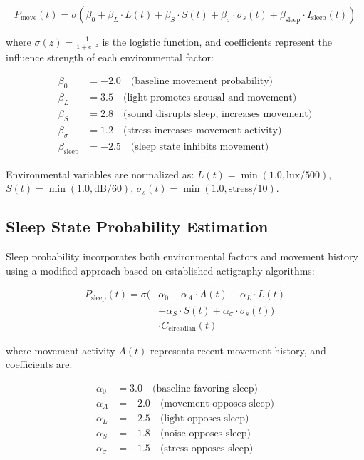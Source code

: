 \documentclass[conference]{IEEEtran}
\begin{document}
\begin{equation}
	P_{\text{move}}(t) = \sigma\left(\beta_0 + \beta_L \cdot L(t) + \beta_S \cdot S(t) + \beta_{\sigma} \cdot \sigma_s(t) + \beta_{\text{sleep}} \cdot I_{\text{sleep}}(t)\right)
\end{equation}

where $\sigma(z) = \frac{1}{1+e^{-z}}$ is the logistic function, and coefficients represent the influence strength of each environmental factor:

\begin{align}
	\beta_0               & = -2.0 \quad \text{(baseline movement probability)}                      \\
	\beta_L    & = 3.5 \quad \text{(light promotes arousal and movement)}          \\
	\beta_S     & = 2.8 \quad \text{(sound disrupts sleep, increases movement)}          \\
	\beta_{\sigma} & = 1.2 \quad \text{(stress increases movement activity)}                \\
	\beta_{\text{sleep}}  & = -2.5 \quad \text{(sleep state inhibits movement)}
\end{align}

Environmental variables are normalized as: $L(t) = \min(1.0, \text{lux}/500)$, $S(t) = \min(1.0, \text{dB}/60)$, $\sigma_s(t) = \min(1.0, \text{stress}/10)$.

\subsection{Sleep State Probability Estimation}

Sleep probability incorporates both environmental factors and movement history using a modified approach based on established actigraphy algorithms:

	\begin{equation}
	\begin{aligned}
    P_{\text{sleep}}(t) = \sigma\big(&\alpha_0 + \alpha_A \cdot A(t) + \alpha_L \cdot L(t) \\
    &+ \alpha_S \cdot S(t) + \alpha_{\sigma} \cdot \sigma_s(t)\big) \\
    &\cdot C_{\text{circadian}}(t)
\end{aligned}
\end{equation}

where movement activity $A(t)$ represents recent movement history, and coefficients are:

\begin{align}
	\alpha_0                 & = 3.0 \quad \text{(baseline favoring sleep)}          \\
	\alpha_A & = -2.0 \quad \text{(movement opposes sleep)} \\
	\alpha_L      & = -2.5 \quad \text{(light opposes sleep)}    \\
	\alpha_S       & = -1.8 \quad \text{(noise opposes sleep)}             \\
	\alpha_{\sigma}   & = -1.5 \quad \text{(stress opposes sleep)}
\end{align}
\end{document}
